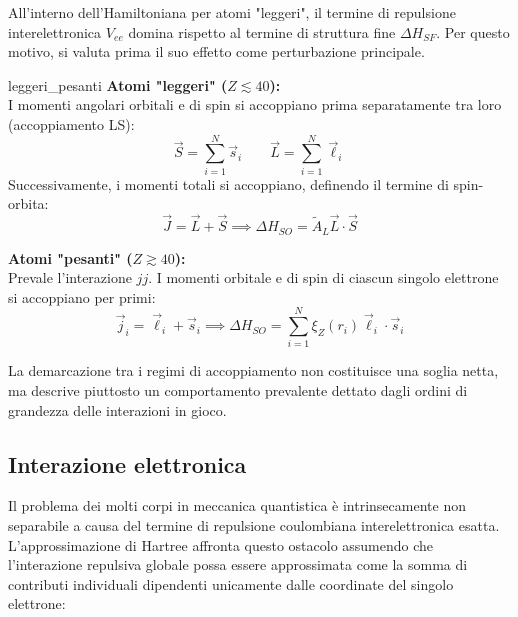 All'interno dell'Hamiltoniana per atomi "leggeri", il termine di repulsione interelettronica \( V_{ee} \) domina rispetto al termine di struttura fine \( \Delta H_{SF} \). Per questo motivo, si valuta prima il suo effetto come perturbazione principale.

\begin{note}{ }{leggeri_pesanti}
    \textbf{Atomi "leggeri" (\( Z \lesssim 40 \)):} \\
    I momenti angolari orbitali e di spin si accoppiano prima separatamente tra loro (accoppiamento LS):
    \begin{equation}
        \vec{S} = \sum_{i=1}^{N} \vec{s}_i \qquad \vec{L} = \sum_{i=1}^{N} \vec{\ell}_i
    \end{equation}
    Successivamente, i momenti totali si accoppiano, definendo il termine di spin-orbita:
    \begin{equation}
        \vec{J} = \vec{L} + \vec{S} \implies \Delta H_{SO} = \tilde{A}_L \vec{L} \cdot \vec{S}
    \end{equation}

    \vspace{0.3cm}
    \textbf{Atomi "pesanti" (\( Z \gtrsim 40 \)):} \\
    Prevale l'interazione \( jj \). I momenti orbitale e di spin di ciascun singolo elettrone si accoppiano per primi:
    \begin{equation}
        \vec{j}_i = \vec{\ell}_i + \vec{s}_i \implies \Delta H_{SO} = \sum_{i=1}^{N} \xi_Z(r_i) \vec{\ell}_i \cdot \vec{s}_i
    \end{equation}

La demarcazione tra i regimi di accoppiamento non costituisce una soglia netta, ma descrive piuttosto un comportamento prevalente dettato dagli ordini di grandezza delle interazioni in gioco.

\end{note}

\subsection{Interazione elettronica}

Il problema dei molti corpi in meccanica quantistica è intrinsecamente non separabile a causa del termine di repulsione coulombiana interelettronica esatta. L'approssimazione di Hartree affronta questo ostacolo assumendo che l'interazione repulsiva globale possa essere approssimata come la somma di contributi individuali dipendenti unicamente dalle coordinate del singolo elettrone:

